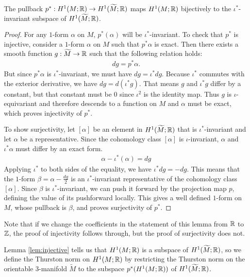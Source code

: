 \begin{lem}
  \label{lem:injective}
  The pullback $p^{\ast}:H^1(M;\mathbb{R})\rightarrow H^1(\widetilde{M};\mathbb{R})$ maps $H^1(M; \mathbb{R})$ bijectively to the $\iota^{\ast}$-invariant subspace of   $H^1(\widetilde{M}; \mathbb{R})$.
\end{lem}
\begin{proof}
  For any $1$-form $\alpha$ on $M$, $p^{\ast}(\alpha)$ will be $\iota^{\ast}$-invariant.
  To check that $p^\ast$ is injective, consider a $1$-form $\alpha$ on $M$ such that $p^{\ast}\alpha$ is exact.
  Then there exists a smooth function $g:\widetilde{M} \to \mathbb{R}$ such that the following relation holds:
    \begin{align*}
        dg = p^{\ast} \alpha.
    \end{align*}
    But since $p^{\ast}\alpha$ is $\iota^{\ast}$-invariant, we must have $dg = \iota^{\ast} dg$.
    Because $\iota^\ast$ commutes with the exterior derivative, we have $dg = d(\iota^{\ast}g)$.
    That means $g$ and $\iota^{\ast}g$ differ by a constant, but that constant must be $0$ since $\iota^2$ is the identity map.
    Thus $g$ is $\iota$-equivariant and therefore descends to a function on $M$ and $\alpha$ must be exact, which proves injectivity of $p^{\ast}$.

    To show surjectivity, let $[\alpha]$ be an element in $H^1(\widetilde{M}; \mathbb{R})$ that is $\iota^{\ast}$-invariant and let $\alpha$ be a representative.
    Since the cohomology class $[\alpha]$ is $\iota$-invariant, $\alpha$ and $\iota^{\ast}\alpha$ must differ by an exact form.
    \begin{align*}
        \alpha - \iota^{\ast}(\alpha) = dg
    \end{align*}
    Applying $\iota^\ast$ to both sides of the equality, we have $\iota^{\ast}dg = -dg$.
    This means that the $1$-form $\beta = \alpha - \frac{dg}{2}$ is an $\iota^{\ast}$-invariant representative of the cohomology class $[\alpha]$.
    Since $\beta$ is $\iota^{\ast}$-invariant, we can push it forward by the projection map $p$, defining the value of its pushforward locally.
    This gives a well defined $1$-form on $M$, whose pullback is $\beta$, and proves surjectivity of $p^{\ast}$.
\end{proof}
\begin{rem}
  Note that if we change the coefficients in the statement of this lemma from $\mathbb{R}$ to $\mathbb{Z}$, the proof of injectivity follows through, but the proof of surjectivity does not.
\end{rem}

Lemma \ref{lem:injective} tells us that $H^1(M; \mathbb{R})$ is a subspace of $H^1(\widetilde{M}; \mathbb{R})$, so we define the Thurston norm on $H^1(M; \mathbb{R})$ by restricting the Thurston norm on the orientable 3-manifold $\widetilde{M}$ to the subspace $p^*(H^1(M;\mathbb{R}))$ of $H^1(\widetilde{M};\mathbb{R})$.

